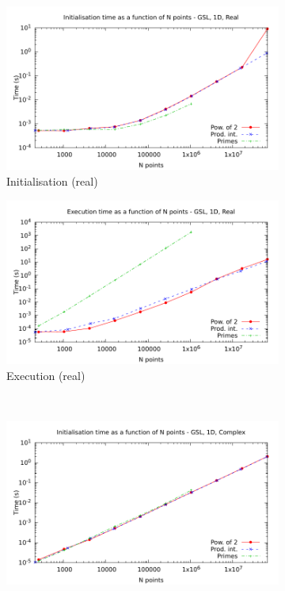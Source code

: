 \documentclass[12pt, a4paper]{article} \setlength{\textheight}{24cm}
\begin{document}
\begin{figure}[htb]
  \centering
  \begin{subfigure}{.5\textwidth}
    \centering
    \includegraphics[width=.9\linewidth]{graphs/1d-gsl-init-r.pdf}
    \caption{Initialisation (real)}
    \label{1DGSLRI}
  \end{subfigure}%
  \begin{subfigure}{.5\textwidth}
    \centering
    \includegraphics[width=.9\linewidth]{graphs/1d-gsl-exec-r.pdf}
    \caption{Execution (real)}
    \label{1DGSLR}
  \end{subfigure}\\
  \begin{subfigure}{.5\textwidth}
    \centering
    \includegraphics[width=.9\linewidth]{graphs/1d-gsl-init-c.pdf}

\end{subfigure}
\end{figure}
\end{document}
